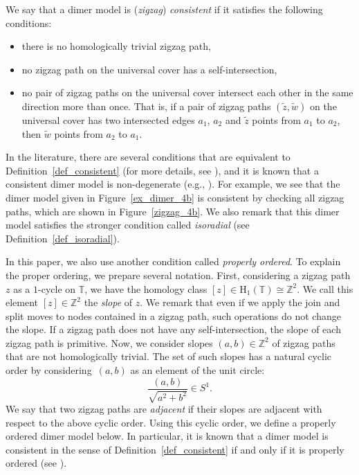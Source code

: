 \documentclass[11pt]{article}
\numberwithin{equation}{section}
\numberwithin{equation}{section}
\numberwithin{figure}{section}
\numberwithin{table}{section}
\newcommand{\ZZ}{\mathbb{Z}}
\newcommand{\TT}{\mathbb{T}}
\newcommand{\rmH}{\mathrm{H}}
\begin{document}
\begin{Definition}
\label{def_consistent}
We say that a dimer model is (\emph{zigzag}) \emph{consistent} if it satisfies the following conditions:
\begin{itemize}\itemsep=0pt
\item [(1)] there is no homologically trivial zigzag path,
\item [(2)] no zigzag path on the universal cover has a self-intersection,
\item [(3)] no pair of zigzag paths on the universal cover intersect each other in the same direction more than once.
That is, if a pair of zigzag paths $(\widetilde{z},\widetilde{w})$ on the universal cover has two intersected edges $a_1$, $a_2$
and $\widetilde{z}$ points from $a_1$ to $a_2$, then $\widetilde{w}$ points from $a_2$ to $a_1$.
\end{itemize}
\end{Definition}

In the literature, there are several conditions that are equivalent to Definition~\ref{def_consistent} (for more details, see \cite{Boc1,IU1}),
and it is known that a consistent dimer model is non-degenerate (e.g., \cite[Proposition~8.1]{IU2}).
For example, we see that the dimer model given in Figure~\ref{ex_dimer_4b} is consistent by checking all zigzag paths, which are shown in Figure~\ref{zigzag_4b}.
We also remark that this dimer model satisfies the stronger condition called \emph{isoradial} (see Definition~\ref{def_isoradial}).

In this paper, we also use another condition called \emph{properly ordered}.
To explain the proper ordering, we prepare several notation.
First, considering a zigzag path $z$ as a $1$-cycle on $\TT$, we have the homology class $[z]\in\rmH_1(\TT)\cong\ZZ^2$. We call this element $[z]\in\ZZ^2$ the \emph{slope} of $z$.
We remark that even if we apply the join and split moves to nodes contained in a zigzag path, such operations do not change the slope.
If a zigzag path does not have any self-intersection, the slope of each zigzag path is primitive.
Now, we consider slopes $(a,b)\in\ZZ^2$ of zigzag paths that are not homologically trivial.
The set of such slopes has a natural cyclic order by considering~$(a,b)$ as an element of the unit circle:
\begin{displaymath}
\frac{(a,b)}{\sqrt{a^2+b^2}}\in S^1.
\end{displaymath}
We say that two zigzag paths are \emph{adjacent} if their slopes are adjacent with respect to the above cyclic order.
Using this cyclic order, we define a properly ordered dimer model below.
In particular, it is known that a dimer model is consistent in the sense of Definition~\ref{def_consistent} if and only if it is properly ordered (see \cite[Proposition~4.4]{IU1}).
\end{document}
